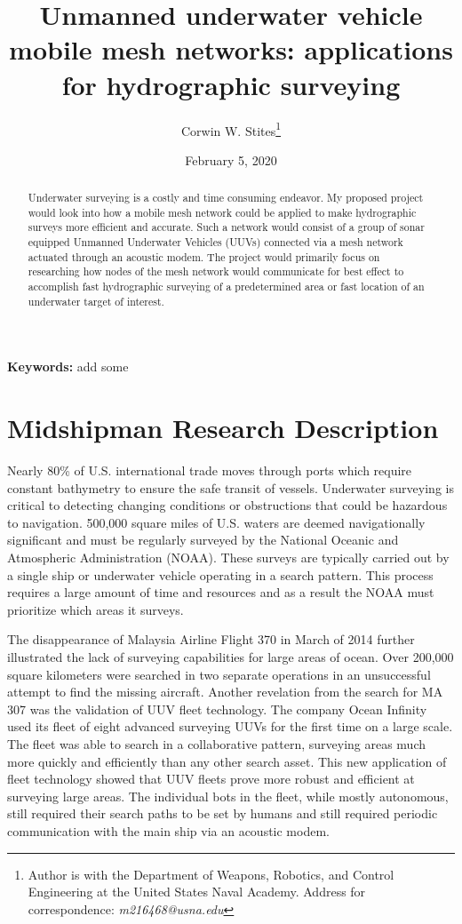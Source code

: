 \documentclass[10pt]{article}
\title{Unmanned underwater vehicle mobile mesh networks: applications for hydrographic surveying}
\author{Corwin W. Stites\thanks{Author is with the Department of Weapons, Robotics, and Control Engineering at the United States Naval Academy. Address for correspondence: \emph{m216468@usna.edu}}}
\date{February 5, 2020}
\begin{document}
\maketitle

\begin{abstract}
	Underwater surveying is a costly and time consuming endeavor. My proposed project would look into how a mobile mesh network could be applied to make hydrographic surveys more efficient and accurate. Such a network would consist of a group of sonar equipped Unmanned Underwater Vehicles (UUVs) connected via a mesh network actuated through an acoustic modem. The project would primarily focus on researching how nodes of the mesh network would communicate for best effect to accomplish fast hydrographic surveying of a predetermined area or fast location of an underwater target of interest. 
\end{abstract}
{\scriptsize\textbf{Keywords: } add some}

\section{Midshipman Research Description}
Nearly 80\% of U.S. international trade moves through ports which require constant bathymetry to ensure the safe transit of vessels. Underwater surveying is critical to detecting changing conditions or obstructions that could be hazardous to navigation. 500,000 square miles of U.S. waters are deemed navigationally significant and must be regularly surveyed by the National Oceanic and Atmospheric Administration (NOAA). These surveys are typically carried out by a single ship or underwater vehicle operating in a search pattern. This process requires a large amount of time and resources and as a result the NOAA must prioritize which areas it surveys\cite{noaa2009hydrographic}.
	
The disappearance of Malaysia Airline Flight 370 in March of 2014 further illustrated the lack of surveying capabilities for large areas of ocean. Over 200,000 square kilometers were searched in two separate operations in an unsuccessful attempt to find the missing aircraft\cite{australia2018joint}. Another revelation from the search for MA 307 was the validation of UUV fleet technology. The company Ocean Infinity used its fleet of eight advanced surveying UUVs for the first time on a large scale. The fleet was able to search in a collaborative pattern, surveying areas much more quickly and efficiently than any other search asset\cite{economist2018fantastical}. This new application of fleet technology showed that UUV fleets prove more robust and efficient at surveying large areas. The individual bots in the fleet, while mostly autonomous, still required their search paths to be set by humans and still required periodic communication with the main ship via an acoustic modem\cite{haun2017ocean}. 	
\end{document}
